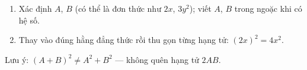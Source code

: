 \begin{enumerate}
\item Xác định $A$, $B$ (có thể là đơn thức như $2x$, $3y^2$); viết $A$, $B$ trong ngoặc khi có hệ số.
\item Thay vào đúng hằng đẳng thức rồi thu gọn từng hạng tử: $(2x)^2=4x^2$.
\end{enumerate}
Lưu ý: $(A+B)^2\ne A^2+B^2$ — không quên hạng tử $2AB$.

